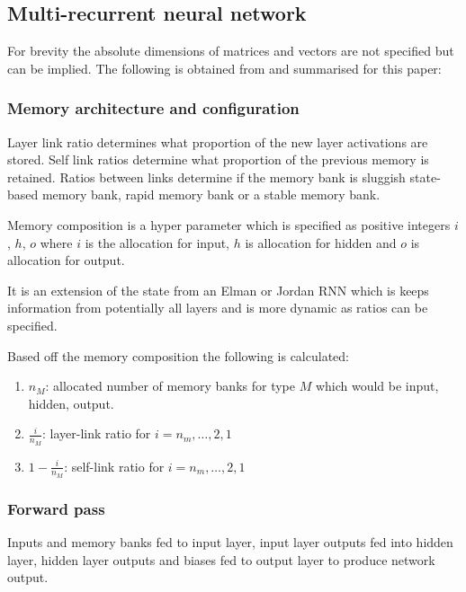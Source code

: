 \documentclass[conference]{IEEEtran}
\begin{document}
\subsection{Multi-recurrent neural network}

For brevity the absolute dimensions of matrices and vectors are not specified but can be implied. The following is obtained from \cite{10.5555/AAI29191757}  and summarised for this paper:

\subsubsection{Memory architecture and configuration}

Layer link ratio determines what proportion of the new layer activations are stored. Self link ratios determine what proportion of the previous memory is retained. Ratios between links determine if the memory bank is sluggish state-based memory bank, rapid memory bank or a stable memory bank.

Memory composition is a hyper parameter which is specified as positive integers $i$, $h$, $o$ where $i$ is the allocation for input, $h$ is allocation for hidden and $o$ is allocation for output.

It is an extension of the state from an Elman or Jordan RNN which is keeps information from potentially all layers and is more dynamic as ratios can be specified.

Based off the memory composition the following is calculated:

\begin{enumerate}
	\item $n_M$: allocated number of memory banks for type $M$ which would be input, hidden, output.
	\item $\frac{i}{n_M}$: layer-link ratio for $i=n_m, \dots, 2, 1$
	\item $1 - \frac{i}{n_M}$: self-link ratio for $i=n_m, \dots, 2, 1$
\end{enumerate}





\subsubsection{Forward pass}

Inputs and memory banks fed to input layer, input layer outputs fed into hidden layer, hidden layer outputs and biases fed to output layer to produce network output.
\end{document}
